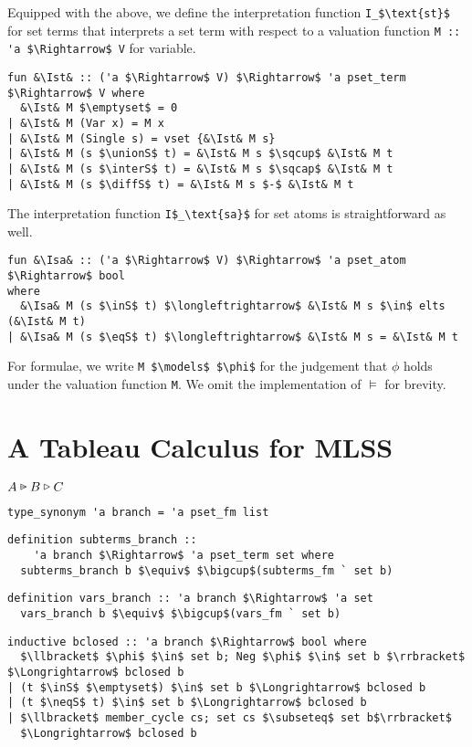 \documentclass[sigplan,10pt,anonymous,review]{acmart}
\newcommand{\lefttrianglebar}{\mathrel{\tikz[baseline]{\draw (1ex, 0.75ex) -- (0, 1.25ex) -- (0, 0.25ex) -- cycle; \draw (0, 0.75ex) -- (1ex, 0.75ex);}}}
\newcommand{\lefttriangle}{\mathrel{\tikz[baseline]{\draw (1ex, 0.75ex) -- (0, 1.25ex) -- (0, 0.25ex) -- cycle;}}}
\newcommand{\sextends}{\lefttriangle}
\newcommand{\fextends}{\lefttrianglebar}
\newcommand{\unionS}{\sqcup_\text{s}}
\newcommand{\interS}{\sqcap_\text{s}}
\newcommand{\diffS}{-_\text{s}}
\newcommand{\inS}{\in_\text{s}}
\newcommand{\eqS}{\approx_\text{s}}
\newcommand{\neqS}{{\not\approx}_\text{s}}
\newcommand{\Ist}{I$_\text{st}$}
\newcommand{\Isa}{I$_\text{sa}$}
\begin{document}
Equipped with the above, we define the interpretation function \lstinline!I_$\text{st}$! for set terms that interprets a set term with respect to a valuation function \lstinline!M :: 'a $\Rightarrow$ V! for variable.
\begin{lstlisting}
fun &\Ist& :: ('a $\Rightarrow$ V) $\Rightarrow$ 'a pset_term $\Rightarrow$ V where
  &\Ist& M $\emptyset$ = 0
| &\Ist& M (Var x) = M x
| &\Ist& M (Single s) = vset {&\Ist& M s}
| &\Ist& M (s $\unionS$ t) = &\Ist& M s $\sqcup$ &\Ist& M t 
| &\Ist& M (s $\interS$ t) = &\Ist& M s $\sqcap$ &\Ist& M t 
| &\Ist& M (s $\diffS$ t) = &\Ist& M s $-$ &\Ist& M t 
\end{lstlisting}
The interpretation function \lstinline!I$_\text{sa}$! for set atoms is straightforward as well.
\begin{lstlisting}
fun &\Isa& :: ('a $\Rightarrow$ V) $\Rightarrow$ 'a pset_atom $\Rightarrow$ bool
where
  &\Isa& M (s $\inS$ t) $\longleftrightarrow$ &\Ist& M s $\in$ elts (&\Ist& M t)
| &\Isa& M (s $\eqS$ t) $\longleftrightarrow$ &\Ist& M s = &\Ist& M t
\end{lstlisting}
For formulae, we write \lstinline!M $\models$ $\phi$! for the judgement that $\phi$ holds under the valuation function \lstinline!M!.
We omit the implementation of $\models$ for brevity.

\section{A Tableau Calculus for MLSS}
$A \fextends B \sextends C$

\begin{lstlisting}
type_synonym 'a branch = 'a pset_fm list
\end{lstlisting}

\begin{lstlisting}
definition subterms_branch ::
    'a branch $\Rightarrow$ 'a pset_term set where
  subterms_branch b $\equiv$ $\bigcup$(subterms_fm ` set b)
\end{lstlisting}

\begin{lstlisting}
definition vars_branch :: 'a branch $\Rightarrow$ 'a set 
  vars_branch b $\equiv$ $\bigcup$(vars_fm ` set b)
\end{lstlisting}

\begin{lstlisting}
inductive bclosed :: 'a branch $\Rightarrow$ bool where
  $\llbracket$ $\phi$ $\in$ set b; Neg $\phi$ $\in$ set b $\rrbracket$ $\Longrightarrow$ bclosed b
| (t $\inS$ $\emptyset$) $\in$ set b $\Longrightarrow$ bclosed b
| (t $\neqS$ t) $\in$ set b $\Longrightarrow$ bclosed b
| $\llbracket$ member_cycle cs; set cs $\subseteq$ set b$\rrbracket$
  $\Longrightarrow$ bclosed b
\end{lstlisting}
\end{document}

